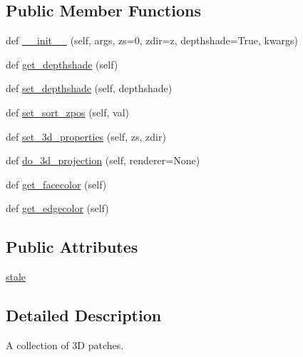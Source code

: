 \subsection*{Public Member Functions}
\begin{DoxyCompactItemize}
\item 
def \hyperlink{classmplot3d_1_1art3d_1_1Patch3DCollection_a920a0bd33bae0010e96dfc2a7ab5d6ef}{\+\_\+\+\_\+init\+\_\+\+\_\+} (self, args, zs=0, zdir=\textquotesingle{}z\textquotesingle{}, depthshade=True, kwargs)
\item 
def \hyperlink{classmplot3d_1_1art3d_1_1Patch3DCollection_a2de8cb759f401dc7885d3cebf9578276}{get\+\_\+depthshade} (self)
\item 
def \hyperlink{classmplot3d_1_1art3d_1_1Patch3DCollection_ae345d6a4d0818d61cac104dac910cc70}{set\+\_\+depthshade} (self, depthshade)
\item 
def \hyperlink{classmplot3d_1_1art3d_1_1Patch3DCollection_ae08662e089212e7c0a1e4a4a3fa80174}{set\+\_\+sort\+\_\+zpos} (self, val)
\item 
def \hyperlink{classmplot3d_1_1art3d_1_1Patch3DCollection_aee14bb886379cd95e2238be49c9859e5}{set\+\_\+3d\+\_\+properties} (self, zs, zdir)
\item 
def \hyperlink{classmplot3d_1_1art3d_1_1Patch3DCollection_a9adaf4437b78c23ca0d431817afd3594}{do\+\_\+3d\+\_\+projection} (self, renderer=None)
\item 
def \hyperlink{classmplot3d_1_1art3d_1_1Patch3DCollection_a7b5b2b5092cf6aeb17526ea36d879135}{get\+\_\+facecolor} (self)
\item 
def \hyperlink{classmplot3d_1_1art3d_1_1Patch3DCollection_aff06094a18a56306162cfd2d7f1e22bc}{get\+\_\+edgecolor} (self)
\end{DoxyCompactItemize}
\subsection*{Public Attributes}
\begin{DoxyCompactItemize}
\item 
\hyperlink{classmplot3d_1_1art3d_1_1Patch3DCollection_a172b65edc885612a09f70dbbceb4e431}{stale}
\end{DoxyCompactItemize}


\subsection{Detailed Description}
\begin{DoxyVerb}A collection of 3D patches.
\end{DoxyVerb}
 

